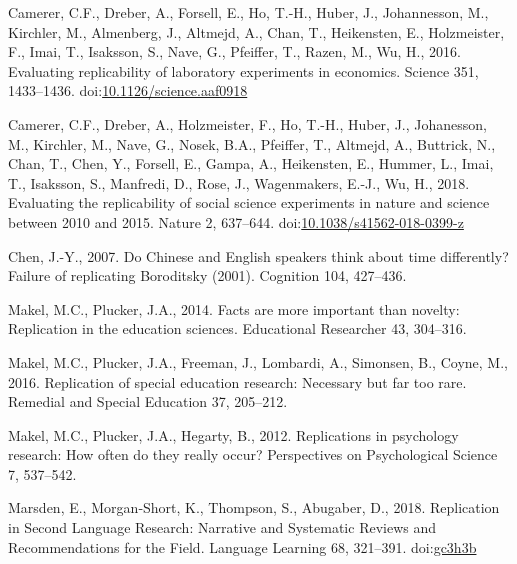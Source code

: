 \documentclass[]{elsarticle} %
\newlength{\cslhangindent}
\newenvironment{CSLReferences}[2] %
 {%
  \setlength{\parindent}{0pt}
  \ifodd #1 \everypar{\setlength{\hangindent}{\cslhangindent}}\ignorespaces\fi
  \ifnum #2 > 0
  \setlength{\parskip}{#2\baselineskip}
  \fi
 }%
 {}
\begin{document}
\hypertarget{refs}{}
\begin{CSLReferences}{1}{0}
\leavevmode{}%
Camerer, C.F., Dreber, A., Forsell, E., Ho, T.-H., Huber, J.,
Johannesson, M., Kirchler, M., Almenberg, J., Altmejd, A., Chan, T.,
Heikensten, E., Holzmeister, F., Imai, T., Isaksson, S., Nave, G.,
Pfeiffer, T., Razen, M., Wu, H., 2016. Evaluating replicability of
laboratory experiments in economics. Science 351, 1433--1436.
doi:\href{https://doi.org/10.1126/science.aaf0918}{10.1126/science.aaf0918}

\leavevmode{}%
Camerer, C.F., Dreber, A., Holzmeister, F., Ho, T.-H., Huber, J.,
Johanesson, M., Kirchler, M., Nave, G., Nosek, B.A., Pfeiffer, T.,
Altmejd, A., Buttrick, N., Chan, T., Chen, Y., Forsell, E., Gampa, A.,
Heikensten, E., Hummer, L., Imai, T., Isaksson, S., Manfredi, D., Rose,
J., Wagenmakers, E.-J., Wu, H., 2018. Evaluating the replicability of
social science experiments in nature and science between 2010 and 2015.
Nature 2, 637--644.
doi:\href{https://doi.org/10.1038/s41562-018-0399-z}{10.1038/s41562-018-0399-z}

\leavevmode{}%
Chen, J.-Y., 2007. Do {Chinese} and {English} speakers think about time
differently? {Failure} of replicating {Boroditsky} (2001). Cognition
104, 427--436.

\leavevmode{}%
Makel, M.C., Plucker, J.A., 2014. Facts are more important than novelty:
Replication in the education sciences. Educational Researcher 43,
304--316.

\leavevmode{}%
Makel, M.C., Plucker, J.A., Freeman, J., Lombardi, A., Simonsen, B.,
Coyne, M., 2016. Replication of special education research: Necessary
but far too rare. Remedial and Special Education 37, 205--212.

\leavevmode{}%
Makel, M.C., Plucker, J.A., Hegarty, B., 2012. Replications in
psychology research: {How} often do they really occur? Perspectives on
Psychological Science 7, 537--542.

\leavevmode{}%
Marsden, E., Morgan‐Short, K., Thompson, S., Abugaber, D., 2018.
Replication in {Second} {Language} {Research}: {Narrative} and
{Systematic} {Reviews} and {Recommendations} for the {Field}. Language
Learning 68, 321--391. doi:\href{https://doi.org/gc3h3b}{gc3h3b}


\end{CSLReferences}
\end{document}

